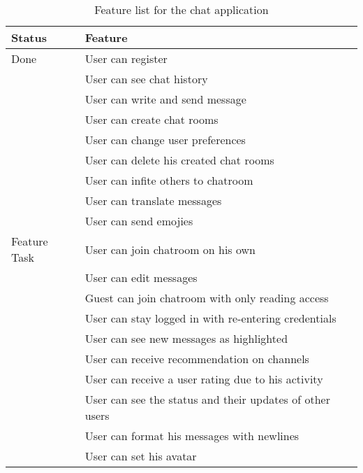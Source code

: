 \begin{table}[!htp]
	\begin{tabularx}{\textwidth}{XX}
		\textbf{Status} & \textbf{Feature} \\\hline
		Done & User can register \\
		& User can see chat history \\
		& User can write and send message \\
		& User can create chat rooms \\
		& User can change user preferences \\
		& User can delete his created chat rooms \\
		& User can infite others to chatroom \\
		& User can translate messages \\
		& User can send emojies \\\hline\hline
		Feature Task
		& User can join chatroom on his own \\
		& User can edit messages \\
		& Guest can join chatroom with only reading access \\
		& User can stay logged in with re-entering credentials \\
		& User can see new messages as highlighted \\
		& User can receive recommendation on channels \\
		& User can receive a user rating due to his activity \\
		& User can see the status and their updates of other users \\
		& User can format his messages with newlines \\
		& User can set his avatar
	\end{tabularx}\caption{Feature list for the chat application}\label{fig:feature-list}
\end{table}
